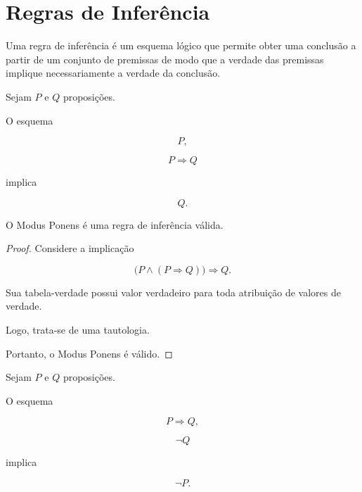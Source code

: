 \documentclass[../../main]{subfiles}
\begin{document}
\section{Regras de Inferência}
\label{sec:matematica:logica-matematica:regras-de-inferencia}

\begin{defn}
	\label{def:matematica:logica-matematica:regras-de-inferencia:regra-de-inferencia}

	Uma regra de inferência é um esquema lógico que permite obter uma
	conclusão a partir de um conjunto de premissas de modo que a verdade
	das premissas implique necessariamente a verdade da conclusão.
\end{defn}

\begin{defn}
	\label{def:matematica:logica-matematica:regras-de-inferencia:modus-ponens}

	Sejam \(P\) e \(Q\) proposições.

	O esquema

	\[
		P,
	\]

	\[
		P \Rightarrow Q
	\]

	implica

	\[
		Q.
	\]

\end{defn}

\begin{prop}
	\label{prop:matematica:logica-matematica:regras-de-inferencia:validade-modus-ponens}

	O Modus Ponens é uma regra de inferência válida.
\end{prop}

\begin{proof}

	Considere a implicação

	\[
		\bigl(
		P
		\land
			(P \Rightarrow Q)
		\bigr)
		\Rightarrow
		Q.
	\]

	Sua tabela-verdade possui valor verdadeiro para toda atribuição de
	valores de verdade.

	Logo, trata-se de uma tautologia.

	Portanto, o Modus Ponens é válido.

\end{proof}

\begin{defn}
	\label{def:matematica:logica-matematica:regras-de-inferencia:modus-tollens}

	Sejam \(P\) e \(Q\) proposições.

	O esquema

	\[
		P \Rightarrow Q,
	\]

	\[
		\neg Q
	\]

	implica

	\[
		\neg P.
	\]

\end{defn}
\end{document}
